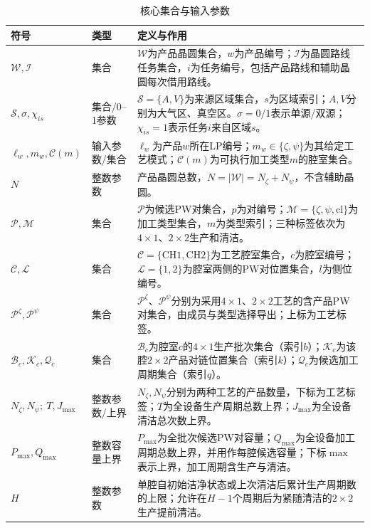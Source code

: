 \documentclass[final,5p,times,twocolumn]{elsarticle}
\begin{document}
\begin{table}[t]
\centering
\scriptsize
\setlength{\tabcolsep}{3pt}
\caption{核心集合与输入参数}
\label{tab:symbol-cn-a}
\begin{tabular}{C{0.23\textwidth}C{0.10\textwidth}C{0.61\textwidth}}
\toprule
符号 & 类型 & 定义与作用 \\
\midrule
$\mathcal W,\mathcal I$ & 集合 & $\mathcal W$为产品晶圆集合，$w$为产品编号；$\mathcal I$为晶圆路线任务集合，$i$为任务编号，包括产品路线和辅助晶圆每次借用路线。\\
$\mathcal S,\sigma,\chi_{is}$ & 集合/0--1参数 & $\mathcal S=\{A,V\}$为来源区域集合，$s$为区域索引；$A,V$分别为大气区、真空区。$\sigma=0/1$表示单源/双源；$\chi_{is}=1$表示任务$i$来自区域$s$。\\
$\ell_w,m_w,\mathcal C(m)$ & 输入参数/集合 & $\ell_w$为产品$w$所在LP编号；$m_w\in\{\zeta,\psi\}$为其给定工艺模式；$\mathcal C(m)$为可执行加工类型$m$的腔室集合。\\
$N$ & 整数参数 & 产品晶圆总数，$N=|\mathcal W|=N_{\zeta}+N_{\psi}$，不含辅助晶圆。\\
$\mathcal P,\mathcal M$ & 集合 & $\mathcal P$为候选PW对集合，$p$为对编号；$\mathcal M=\{\zeta,\psi,\mathrm{cl}\}$为加工类型集合，$m$为类型索引；三种标签依次为$4\times1$、$2\times2$生产和清洁。\\
$\mathcal C,\mathcal L$ & 集合 & $\mathcal C=\{\mathrm{CH1,CH2}\}$为工艺腔室集合，$c$为腔室编号；$\mathcal L=\{1,2\}$为腔室两侧的PW对位置集合，$l$为侧位编号。\\
$\mathcal P^{\zeta},\mathcal P^{\psi}$ & 集合 & $\mathcal P^{\zeta}$、$\mathcal P^{\psi}$分别为采用$4\times1$、$2\times2$工艺的含产品PW对集合，由成员与类型选择导出；上标为工艺标签。\\
$\mathcal B_c,\mathcal K_c,\mathcal Q_c$ & 集合 & $\mathcal B_c$为腔室$c$的$4\times1$生产批次集合（索引$b$）；$\mathcal K_c$为该腔$2\times2$产品对链位置集合（索引$k$）；$\mathcal Q_c$为候选加工周期集合（索引$q$）。\\
$N_{\zeta},N_{\psi};\ T,J_{\max}$ & 整数参数/上界 & $N_{\zeta},N_{\psi}$分别为两种工艺的产品数量，下标为工艺标签；$T$为全设备生产周期总数上界；$J_{\max}$为全设备清洁总次数上界。\\
$P_{\max},Q_{\max}$ & 整数容量上界 & $P_{\max}$为全批次候选PW对容量；$Q_{\max}$为全设备加工周期总数上界，并用作每腔候选容量；下标$\max$表示上界，加工周期含生产与清洁。\\
$H$ & 整数参数 & 单腔自初始洁净状态或上次清洁后累计生产周期数的上限；允许在$H-1$个周期后为紧随清洁的$2\times2$生产提前清洁。\\

\end{tabular}
\end{table}
\end{document}
